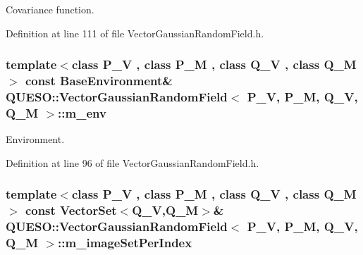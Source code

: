 Covariance function. 



Definition at line 111 of file Vector\-Gaussian\-Random\-Field.\-h.

\hypertarget{class_q_u_e_s_o_1_1_vector_gaussian_random_field_ab4ad80cb336314fd0025abf0d37c5aa0}{
\subsubsection[{m\-\_\-env}]{\setlength{\rightskip}{0pt plus 5cm}template$<$class P\-\_\-\-V , class P\-\_\-\-M , class Q\-\_\-\-V , class Q\-\_\-\-M $>$ const {\bf Base\-Environment}\& {\bf Q\-U\-E\-S\-O\-::\-Vector\-Gaussian\-Random\-Field}$<$ P\-\_\-\-V, P\-\_\-\-M, Q\-\_\-\-V, Q\-\_\-\-M $>$\-::m\-\_\-env\hspace{0.3cm}{\ttfamily [protected]}}}\label{class_q_u_e_s_o_1_1_vector_gaussian_random_field_ab4ad80cb336314fd0025abf0d37c5aa0}


Environment. 



Definition at line 96 of file Vector\-Gaussian\-Random\-Field.\-h.

\hypertarget{class_q_u_e_s_o_1_1_vector_gaussian_random_field_a6e1a9a6a3512559e1579e3c8a266141f}{
\subsubsection[{m\-\_\-image\-Set\-Per\-Index}]{\setlength{\rightskip}{0pt plus 5cm}template$<$class P\-\_\-\-V , class P\-\_\-\-M , class Q\-\_\-\-V , class Q\-\_\-\-M $>$ const {\bf Vector\-Set}$<$Q\-\_\-\-V,Q\-\_\-\-M$>$\& {\bf Q\-U\-E\-S\-O\-::\-Vector\-Gaussian\-Random\-Field}$<$ P\-\_\-\-V, P\-\_\-\-M, Q\-\_\-\-V, Q\-\_\-\-M $>$\-::m\-\_\-image\-Set\-Per\-Index\hspace{0.3cm}{\ttfamily [protected]}}}\label{class_q_u_e_s_o_1_1_vector_gaussian_random_field_a6e1a9a6a3512559e1579e3c8a266141f}


